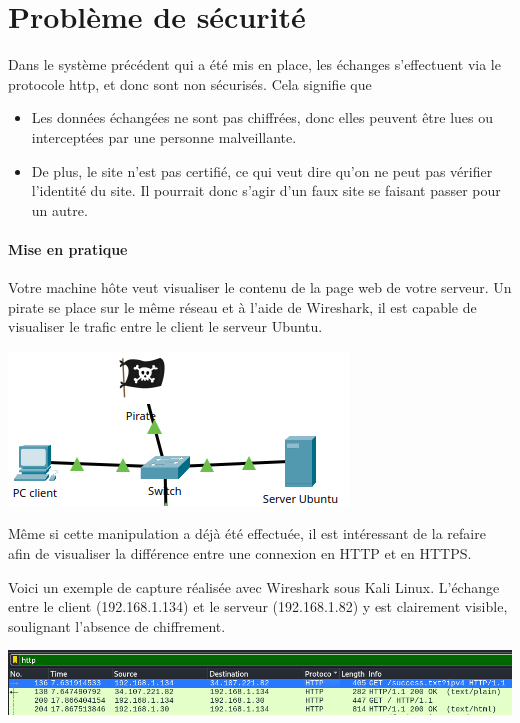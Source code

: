 \documentclass[french, 12pt]{article}%
\newcommand{\itemE}{\item[$\bullet$]}
\begin{document}
\tableofcontents
\newpage


\section{Problème de sécurité}
Dans le système précédent qui a été mis en place, les échanges s'effectuent via le protocole http, et donc sont non sécurisés. Cela signifie que
\begin{itemize}
\itemE Les données échangées ne sont pas chiffrées, donc elles peuvent être lues ou interceptées par une personne malveillante. 
\itemE De plus, le site n’est pas certifié, ce qui veut dire qu'on ne peut pas vérifier l'identité du site. Il pourrait donc s'agir d'un faux site se faisant passer pour un autre.
\end{itemize} 

\paragraph{Mise en pratique}

Votre machine hôte veut visualiser le contenu de la page web de votre serveur.  Un pirate se place sur le même réseau et à l'aide de Wireshark, il est capable de visualiser le trafic entre le client le serveur Ubuntu.
\begin{center}
\includegraphics[scale=0.7]{./ressource/topReseau.png}
\end{center}

Même si cette manipulation a déjà été effectuée, il est intéressant de la refaire afin de visualiser la différence entre une connexion en HTTP et en HTTPS.

Voici un exemple de capture réalisée avec Wireshark sous Kali Linux. L’échange entre le client (192.168.1.134) et le serveur (192.168.1.82) y est clairement visible, soulignant l'absence de chiffrement. 
\begin{center}
\includegraphics[scale=0.5]{./ressource/captureWireshark}
\end{center}
\end{document}
